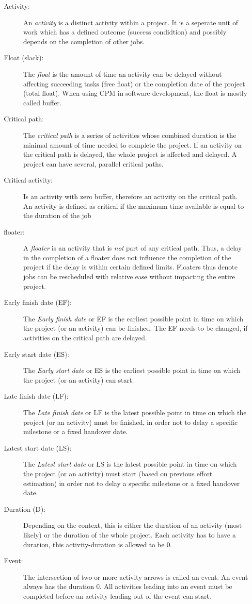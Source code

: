\begin{description}
  \item[Activity:] An \emph{activity} is a distinct activity within a project. It is a seperate unit of work
    which has a defined outcome (success condidtion) and possibly depends on the completion of other
    jobs.
  \item[Float (slack):] The \emph{float} is the amount of time an activity can be delayed without
    affecting succeeding tasks (free float) or the completion date of the project (total float).
    When using CPM in software development, the float is mostly called buffer. 
  \item[Critical path:] The \emph{critical path} is a series of activities whose combined duration is the minimal
    amount of time needed to complete the project.  If an activity on the critical path is delayed,
    the whole project is affected and delayed. A project can have several, parallel critical paths.
  \item[Critical activity:] Is an activity with zero buffer, therefore an activity on the critical
    path. An activity is defined as critical if the maximum time available is equal to the duration of the job\cite[p.
        163]{Kelley:1959:CPS:1460299.1460318}
  \item[floater:] A \emph{floater} is an activity that is \emph{not} part of any critical path. Thus, a delay in the
    completion of a floater does not influence the completion of the project if the delay is within
    certain defined limits. Floaters thus denote jobs can be rescheduled with relative ease without impacting the entire project.
  \item[Early finish date (EF):] The \emph{Early finish date} or EF is the earliest possible point 
    in time on which the project (or an activity) can be finished. The EF needs to be changed, if
    activities on the critical path are delayed. 
  \item[Early start date (ES):] The \emph{Early start date} or ES is the earliest possible point in
    time on which the project (or an activity) can start. 
  \item[Late finish date (LF):] The \emph{Late finish date} or LF is the latest possible point in
    time on which the project (or an activity) must be finished, in order not to delay a specific
    milestone or a fixed handover date.
  \item[Latest start date (LS):] The \emph{Latest start date} or LS is the latest possible point in
    time on which the project (or an activity) must start (based on previous effort estimation) in
    order not to delay a specific milestone or a fixed handover date.
      \item [Duration (D):] Depending on the context, this is either the duration of an activity (most likely) or the duration of the whole project. Each activity has to have a duration, this activity-duration is allowed to be 0.
  \item [Event:] The intersection of two or more activity arrows is called an event. An event always has the duration 0. All activities leading into an event must be completed before an activity leading out of the event can start. 
\end{description}

